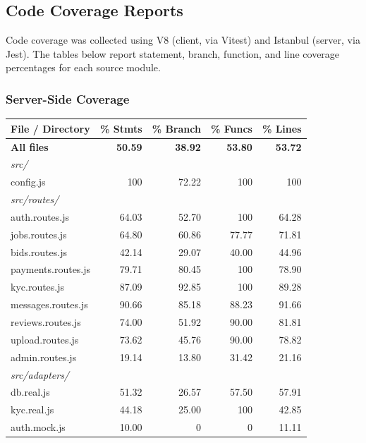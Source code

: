 \documentclass[11pt]{article}
\begin{document}
\subsection{Code Coverage Reports}

Code coverage was collected using V8 (client, via Vitest) and Istanbul
(server, via Jest). The tables below report statement, branch, function,
and line coverage percentages for each source module.

\subsubsection{Server-Side Coverage}

\begin{center}
\small
\begin{longtable}{@{}p{4cm} r r r r@{}}
\toprule
\textbf{File / Directory} & \textbf{\% Stmts} & \textbf{\% Branch} & \textbf{\% Funcs} & \textbf{\% Lines} \\
\midrule
\endhead
\textbf{All files} & \textbf{50.59} & \textbf{38.92} & \textbf{53.80} & \textbf{53.72} \\
\midrule
\multicolumn{5}{l}{\textit{src/}} \\
\quad config.js & 100 & 72.22 & 100 & 100 \\
\midrule
\multicolumn{5}{l}{\textit{src/routes/}} \\
\quad auth.routes.js & 64.03 & 52.70 & 100 & 64.28 \\
\quad jobs.routes.js & 64.80 & 60.86 & 77.77 & 71.81 \\
\quad bids.routes.js & 42.14 & 29.07 & 40.00 & 44.96 \\
\quad payments.routes.js & 79.71 & 80.45 & 100 & 78.90 \\
\quad kyc.routes.js & 87.09 & 92.85 & 100 & 89.28 \\
\quad messages.routes.js & 90.66 & 85.18 & 88.23 & 91.66 \\
\quad reviews.routes.js & 74.00 & 51.92 & 90.00 & 81.81 \\
\quad upload.routes.js & 73.62 & 45.76 & 90.00 & 78.82 \\
\quad admin.routes.js & 19.14 & 13.80 & 31.42 & 21.16 \\
\midrule
\multicolumn{5}{l}{\textit{src/adapters/}} \\
\quad db.real.js & 51.32 & 26.57 & 57.50 & 57.91 \\
\quad kyc.real.js & 44.18 & 25.00 & 100 & 42.85 \\
\quad auth.mock.js & 10.00 & 0 & 0 & 11.11 \\

\end{longtable}
\end{center}
\end{document}
